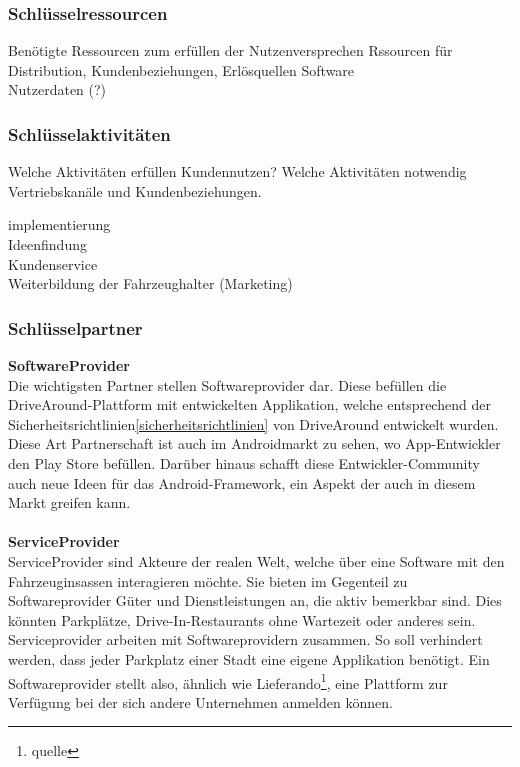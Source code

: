\subsubsection{Schlüsselressourcen}


Benötigte Ressourcen zum erfüllen der Nutzenversprechen
Rssourcen für Distribution, Kundenbeziehungen, Erlösquellen
Software\\
Nutzerdaten (?)\\

\subsubsection{Schlüsselaktivitäten}
Welche Aktivitäten erfüllen Kundennutzen?
Welche Aktivitäten notwendig Vertriebskanäle und Kundenbeziehungen.

implementierung\\
Ideenfindung\\
Kundenservice\\
Weiterbildung der Fahrzeughalter (Marketing)\\


\subsubsection{Schlüsselpartner}

\textbf{SoftwareProvider}\\
Die wichtigsten Partner stellen Softwareprovider dar. Diese befüllen die DriveAround-Plattform mit entwickelten Applikation, welche entsprechend der Sicherheitsrichtlinien\ref{sicherheitsrichtlinien} von DriveAround entwickelt wurden. Diese Art Partnerschaft ist auch im Androidmarkt zu sehen, wo App-Entwickler den Play Store befüllen. Darüber hinaus schafft diese Entwickler-Community auch neue Ideen für das Android-Framework, ein Aspekt der auch in diesem Markt greifen kann.\\\\
\textbf{ServiceProvider}\\
ServiceProvider sind Akteure der realen Welt, welche über eine Software mit den Fahrzeuginsassen interagieren möchte. Sie bieten im Gegenteil zu Softwareprovider Güter und Dienstleistungen an, die aktiv bemerkbar sind. Dies könnten Parkplätze, Drive-In-Restaurants ohne Wartezeit oder anderes sein. Serviceprovider arbeiten mit Softwareprovidern zusammen. So soll verhindert werden, dass jeder Parkplatz einer Stadt eine eigene Applikation benötigt. Ein Softwareprovider stellt also, ähnlich wie Lieferando\footnote{quelle}, eine Plattform zur Verfügung bei der sich andere Unternehmen anmelden können.

